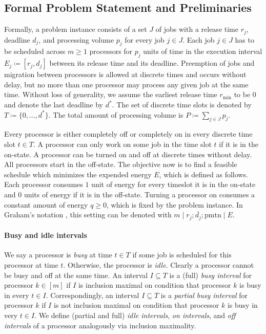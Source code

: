 \documentclass[a4paper]{article}
\begin{document}
\subsection{Formal Problem Statement and Preliminaries}
Formally, a problem instance consists of a set $J$ of jobs with a release time $r_j$, deadline $d_j$, and processing volume $p_j$ for every job $j \in J$.
Each job $j \in J$ has to be scheduled across $m \geq 1$ processors for $p_j$ units of time in the execution interval $E_j \coloneqq [r_j, d_j]$ between its release time and its deadline.
Preemption of jobs and migration between processors is allowed at discrete times and occurs without delay, but no more than one processor may process any given job at the same time.
Without loss of generality, we assume the earliest release time $r_{\min}$ to be $0$ and denote the last deadline by $d^*$.
The set of discrete time slots is denoted by $T \coloneqq \{0, \ldots, d^*\}$.
The total amount of processing volume is $P \coloneqq \sum_{j \in J} p_j$.

Every processor is either completely off or completely on in every discrete time slot $t \in T$.
A processor can only work on some job in the time slot $t$ if it is in the on-state.
A processor can be turned on and off at discrete times without delay.
All processors start in the off-state.
The objective now is to find a feasible schedule which minimizes the expended energy $E$, which is defined as follows.
Each processor consumes $1$ unit of energy for every timeslot it is in the on-state and $0$ units of energy if it is in the off-state.
Turning a processor on consumes a constant amount of energy $q \geq 0$, which is fixed by the problem instance.
In Graham's notation \citep{graham}, this setting can be denoted with $m \mid r_j; \overline{d_j}; \mathrm{pmtn} \mid E$.

\paragraph{Busy and idle intervals}
We say a processor is \emph{busy} at time $t \in T$ if some job is scheduled for this processor at time $t$.
Otherwise, the processor is \emph{idle}.
Clearly a processor cannot be busy and off at the same time.
An interval $I \subseteq T$ is a (full) \emph{busy interval} for processor $k \in [m]$ if $I$ is inclusion maximal on condition that processor $k$ is busy in every $t \in I$.
Correspondingly, an interval $I \subseteq T$ is a \emph{partial busy interval} for processor $k$ if $I$ is not inclusion maximal on condition that processor $k$ is busy in very $t \in I$.
We define (partial and full) \emph{idle intervals}, \emph{on intervals}, and \emph{off intervals} of a processor analogously via inclusion maximality.
\end{document}
